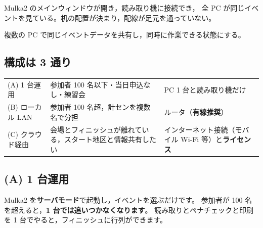\begin{Done}
Mulka2 のメインウィンドウが開き，読み取り機に接続でき，
全 PC が同じイベントを見ている。机の配置が決まり，配線が足元を通っていない。
\end{Done}


\begin{Goal}
複数の PC で同じイベントデータを共有し，同時に作業できる状態にする。
\end{Goal}

\subsection*{構成は 3 通り}

\begin{center}
\small
\begin{tabular}{@{}P{28mm}P{34mm}P{80mm}@{}}
\toprule
{} &  &  \\
\midrule
(A) 1 台運用 & 参加者 100 名以下・当日申込なし・練習会 & PC 1 台と読み取り機だけ \\
(B) ローカル LAN & 参加者 100 名超，計センを複数名で分担 & ルータ（\textbf{有線推奨}） \\
(C) クラウド経由 & 会場とフィニッシュが離れている，スタート地区と情報共有したい
  & インターネット接続（モバイル Wi-Fi 等）と\textbf{ライセンス} \\
\bottomrule
\end{tabular}
\end{center}

\subsection*{(A) 1 台運用}

Mulka2 を\textbf{サーバモード}で起動し，イベントを選ぶだけです。
参加者が 100 名を超えると，\textbf{1 台では追いつかなくなります}。
読み取りとペナチェックと印刷を 1 台でやると，フィニッシュに行列ができます。

